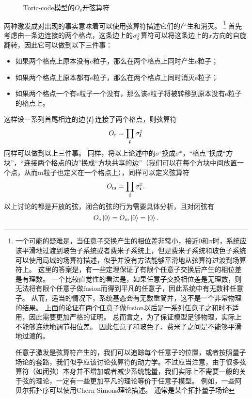 \begin{figure}
    \centering
    \caption{Toric-code模型的$O_\text{e}$开弦算符}
\end{figure}

两种激发成对出现的事实意味着可以使用弦算符描述它们的产生和消灭。%
\footnote{
    一个可能的疑难是，当任意子交换产生的相位差非常小，接近$0$和$\pi$时，系统应该平滑地过渡到玻色子系统或者费米子系统上，但是费米子系统和玻色子系统可以使用局域的场算符描述，似乎并没有方法能够平滑地从弦算符过渡到场算符上。
    这里的答案是，有一些定理保证了有限个任意子交换后产生的相位差是有理数。
    一个比较直觉性的看法是，如果任意子交换相位差是无理数，则无法将有限个任意子做fusion而得到平凡的任意子，因此系统中有无数种任意子。
    从而，适当的情况下，系统基态会有无数重简并，这不是一个非常物理的结果。
    上面的论证在两个任意子做fusion以后是一系列任意子之和时不适用，因此需要更加严格的证明。
    总而言之，为了保证模型足够物理，实际上不能够连续地调节相位差。
    因此任意子和玻色子、费米子之间是不能够平滑地过渡的。

    任意子激发是弦算符产生的，我们可以追踪每个任意子的位置，或者按照量子场论的套路，我们似乎应该讨论弦算符的动力学。不过应当注意，由于很多弦算符（如闭弦）本身并不增加或者减少系统能量，我们实际上不需要一般的关于弦的理论，一定有一些更加平凡的理论等价于任意子模型。
    例如，一些阿贝尔拓扑序可以使用Chern-Simons理论描述。
    通常是某个拓扑量子场论
}%
首先考虑由一条边连接的两个格点，这条边上的${\sigma}^z_{\vb*{i}}$算符可以将这条边上的$x$方向的自旋翻转，因此它可以做到以下三件事：
\begin{itemize}
    \item 如果两个格点上原本没有e粒子，那么在两个格点上同时产生e粒子；
    \item 如果两个格点上原本都有e粒子，那么在两个格点上同时消灭e粒子； 
    \item 如果两个格点一个有e粒子一个没有，那么该e粒子将被转移到原本没有e粒子的格点上。
\end{itemize}
这样设一系列首尾相连的边$\{\vb*{l}\}$连接了两个格点，则弦算符
\begin{equation}
    {O}_\text{e} = \prod_{\vb*{l}} {\sigma}_{\vb*{l}}^z
\end{equation}
同样可以做到以上三件事。
同样，将以上论述中的${\sigma}^z$换成${\sigma}^x$，“格点”换成“方块”，“连接两个格点的边”换成“方块共享的边”（我们可以在每个方块中间放置一个点，从而m粒子也定义在一个格点上），同样可以定义弦算符
\begin{equation}
    {O}_\text{m} = \prod_{\vb*{i}} {\sigma}_{\vb*{i}}^x.
\end{equation}
以上讨论的都是开放的弦，闭合的弦的行为需要具体分析，且对闭弦有
\begin{equation}
    {O}_\text{e} \ket{0} = {O}_\text{m} \ket{0} = \ket{0}.
\end{equation}

